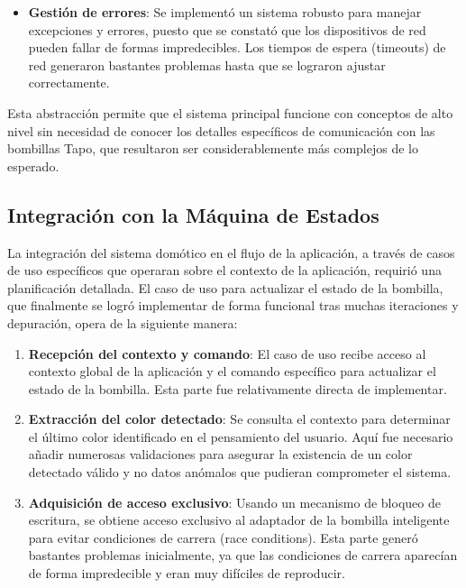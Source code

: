 \begin{enumerate}
\begin{itemize}
    \item \textbf{Gestión de errores}: Se implementó un sistema robusto para manejar excepciones y errores, puesto que se constató que los dispositivos de red pueden fallar de formas impredecibles. Los tiempos de espera (timeouts) de red generaron bastantes problemas hasta que se lograron ajustar correctamente.
\end{itemize}

Esta abstracción permite que el sistema principal funcione con conceptos de alto nivel sin necesidad de conocer los detalles específicos de comunicación con las bombillas Tapo, que resultaron ser considerablemente más complejos de lo esperado.

\subsection{Integración con la Máquina de Estados}

La integración del sistema domótico en el flujo de la aplicación, a través de casos de uso específicos que operaran sobre el contexto de la aplicación, requirió una planificación detallada. El caso de uso para actualizar el estado de la bombilla, que finalmente se logró implementar de forma funcional tras muchas iteraciones y depuración, opera de la siguiente manera:

\begin{enumerate}
    \item \textbf{Recepción del contexto y comando}: El caso de uso recibe acceso al contexto global de la aplicación y el comando específico para actualizar el estado de la bombilla. Esta parte fue relativamente directa de implementar.
    
    \item \textbf{Extracción del color detectado}: Se consulta el contexto para determinar el último color identificado en el pensamiento del usuario. Aquí fue necesario añadir numerosas validaciones para asegurar la existencia de un color detectado válido y no datos anómalos que pudieran comprometer el sistema.
    
    \item \textbf{Adquisición de acceso exclusivo}: Usando un mecanismo de bloqueo de escritura, se obtiene acceso exclusivo al adaptador de la bombilla inteligente para evitar condiciones de carrera (race conditions). Esta parte generó bastantes problemas inicialmente, ya que las condiciones de carrera aparecían de forma impredecible y eran muy difíciles de reproducir.
    

\end{enumerate}
\end{enumerate}
